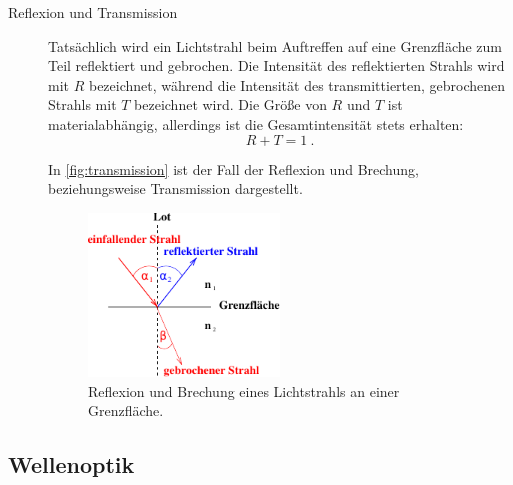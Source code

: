 \begin{description}
    \item[Reflexion und Transmission]
    Tatsächlich wird ein Lichtstrahl beim Auftreffen auf eine Grenzfläche zum Teil reflektiert und gebrochen.
    Die Intensität des reflektierten Strahls wird mit $R$ bezeichnet,
    während die Intensität des transmittierten,
    gebrochenen Strahls mit $T$ bezeichnet wird.
    Die Größe von $R$ und $T$ ist materialabhängig,
    allerdings ist die Gesamtintensität stets erhalten:
    \[ R + T = 1 \ . \]

    In \autoref{fig:transmission} ist der Fall der Reflexion und Brechung, beziehungsweise Transmission dargestellt.
    \begin{figure}[H]
        \centering
        \includegraphics[width=0.5\textwidth]{content/img/Abb_2c.pdf}
        \caption{Reflexion und Brechung eines Lichtstrahls an einer Grenzfläche. \cite{versuchsanleitung}}
        \label{fig:transmission}
    \end{figure}
\end{description}



\subsection{Wellenoptik}

